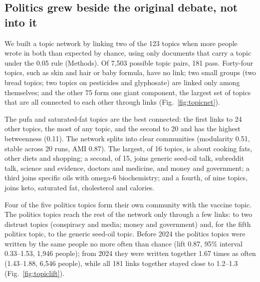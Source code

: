 \subsection*{Politics grew beside the original debate, not into it}
We built a topic network by linking two of the 123 topics when more people wrote in both than expected by chance, using only documents that carry a topic under the 0.05 rule (Methods). Of 7{,}503 possible topic pairs, 181 pass. Forty-four topics, such as skin and hair or baby formula, have no link; two small groups (two bread topics; two topics on pesticides and glyphosate) are linked only among themselves; and the other 75 form one giant component, the largest set of topics that are all connected to each other through links (Fig.~\ref{fig:topicnet}).

The pufa and saturated-fat topics are the best connected: the first links to 24 other topics, the most of any topic, and the second to 20 and has the highest betweenness (0.11). The network splits into clear communities (modularity 0.51, stable across 20 runs, AMI 0.87). The largest, of 16 topics, is about cooking fats, other diets and shopping; a second, of 15, joins generic seed-oil talk, subreddit talk, science and evidence, doctors and medicine, and money and government; a third joins specific oils with omega-6 biochemistry; and a fourth, of nine topics, joins keto, saturated fat, cholesterol and calories.

Four of the five politics topics form their own community with the vaccine topic. The politics topics reach the rest of the network only through a few links: to two distrust topics (conspiracy and media; money and government) and, for the fifth politics topic, to the generic seed-oil topic. Before 2024 the politics topics were written by the same people no more often than chance (lift 0.87, 95\% interval 0.33--1.53, 1{,}946 people); from 2024 they were written together 1.67 times as often (1.43--1.88, 6{,}546 people), while all 181 links together stayed close to 1.2--1.3 (Fig.~\ref{fig:topiclift}).

